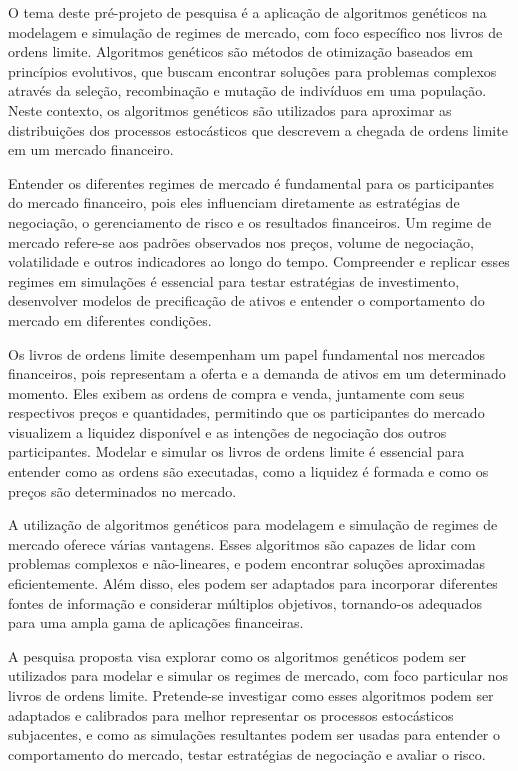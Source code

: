 O tema deste pré-projeto de pesquisa é a aplicação de algoritmos genéticos na modelagem e simulação de regimes de mercado, com foco específico nos livros de ordens limite. Algoritmos genéticos são métodos de otimização baseados em princípios evolutivos, que buscam encontrar soluções para problemas complexos através da seleção, recombinação e mutação de indivíduos em uma população. Neste contexto, os algoritmos genéticos são utilizados para aproximar as distribuições dos processos estocásticos que descrevem a chegada de ordens limite em um mercado financeiro.

Entender os diferentes regimes de mercado é fundamental para os participantes do mercado financeiro, pois eles influenciam diretamente as estratégias de negociação, o gerenciamento de risco e os resultados financeiros. Um regime de mercado refere-se aos padrões observados nos preços, volume de negociação, volatilidade e outros indicadores ao longo do tempo. Compreender e replicar esses regimes em simulações é essencial para testar estratégias de investimento, desenvolver modelos de precificação de ativos e entender o comportamento do mercado em diferentes condições.

Os livros de ordens limite desempenham um papel fundamental nos mercados financeiros, pois representam a oferta e a demanda de ativos em um determinado momento. Eles exibem as ordens de compra e venda, juntamente com seus respectivos preços e quantidades, permitindo que os participantes do mercado visualizem a liquidez disponível e as intenções de negociação dos outros participantes. Modelar e simular os livros de ordens limite é essencial para entender como as ordens são executadas, como a liquidez é formada e como os preços são determinados no mercado.

A utilização de algoritmos genéticos para modelagem e simulação de regimes de mercado oferece várias vantagens. Esses algoritmos são capazes de lidar com problemas complexos e não-lineares, e podem encontrar soluções aproximadas eficientemente. Além disso, eles podem ser adaptados para incorporar diferentes fontes de informação e considerar múltiplos objetivos, tornando-os adequados para uma ampla gama de aplicações financeiras.

A pesquisa proposta visa explorar como os algoritmos genéticos podem ser utilizados para modelar e simular os regimes de mercado, com foco particular nos livros de ordens limite. Pretende-se investigar como esses algoritmos podem ser adaptados e calibrados para melhor representar os processos estocásticos subjacentes, e como as simulações resultantes podem ser usadas para entender o comportamento do mercado, testar estratégias de negociação e avaliar o risco.

